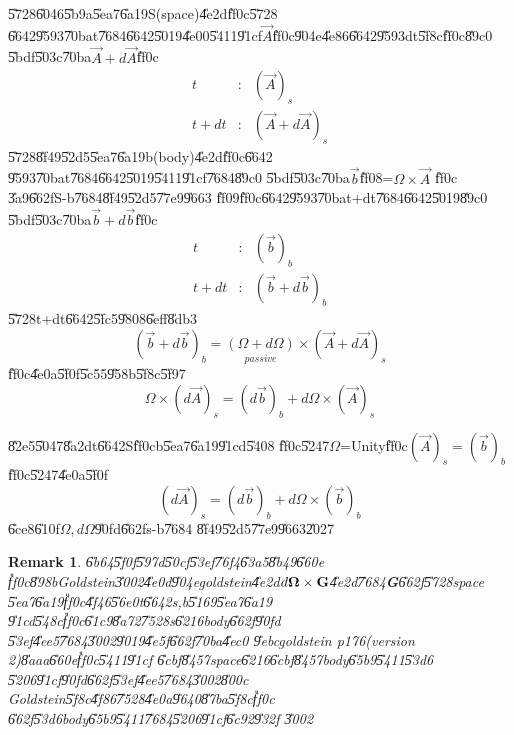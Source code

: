 \documentclass[12pt]{article}
\newtheorem{remark}[theorem]{Remark}
\begin{document}
\U{5728}\U{6046}\U{5b9a}\U{5ea7}\U{6a19}S(space)\U{4e2d}\U{ff0c}\U{5728}%
\U{6642}\U{9593}\U{70ba}t\U{7684}\U{6642}\U{5019}\U{4e00}\U{5411}\U{91cf}$%
\vec{A}$\U{ff0c}\U{904e}\U{4e86}\U{6642}\U{9593}dt\U{5f8c}\U{ff0c}\U{89c0}%
\U{5bdf}\U{503c}\U{70ba}$\vec{A}+d\vec{A}$\U{ff0c}%
\begin{eqnarray}
t &:&(\vec{A})_{s} \\
t+dt &:&\left( \vec{A}+d\vec{A}\right) _{s}
\end{eqnarray}%
\U{5728}\U{8f49}\U{52d5}\U{5ea7}\U{6a19}b(body)\U{4e2d}\U{ff0c}\U{6642}%
\U{9593}\U{70ba}t\U{7684}\U{6642}\U{5019}\U{5411}\U{91cf}\U{7684}\U{89c0}%
\U{5bdf}\U{503c}\U{70ba}$\vec{b}$\U{ff08}=$\Omega \times \vec{A}$ \U{ff0c}%
\U{3a9}\U{662f}S-\TEXTsymbol{>}b\U{7684}\U{8f49}\U{52d5}\U{77e9}\U{9663}%
\U{ff09}\U{ff0c}\U{6642}\U{9593}\U{70ba}t+dt\U{7684}\U{6642}\U{5019}\U{89c0}%
\U{5bdf}\U{503c}\U{70ba}$\vec{b}+d\vec{b}$\U{ff0c}%
\begin{eqnarray}
t &:&\left( \vec{b}\right) _{b} \\
t+dt &:&\left( \vec{b}+d\vec{b}\right) _{b}
\end{eqnarray}%
\U{5728}t+dt\U{6642}\U{5fc5}\U{9808}\U{6eff}\U{8db3}%
\begin{equation}
\left( \vec{b}+d\vec{b}\right) _{b}=\underset{passive}{\left( \Omega
+d\Omega \right) }\times \left( \vec{A}+d\vec{A}\right) _{s}
\end{equation}%
\U{ff0c}\U{4e0a}\U{5f0f}\U{5c55}\U{958b}\U{5f8c}\U{5f97}%
\begin{equation}
\Omega \times \left( d\vec{A}\right) _{s}=\left( d\vec{b}\right)
_{b}+d\Omega \times \left( \vec{A}\right) _{s}
\end{equation}

\U{82e5}\U{5047}\U{8a2d}t\U{6642}S\U{ff0c}b\U{5ea7}\U{6a19}\U{91cd}\U{5408}%
\U{ff0c}\U{5247}$\Omega $=Unity\U{ff0c}$\left( \vec{A}\right) _{s}=\left( 
\vec{b}\right) _{b}$\U{ff0c}\U{5247}\U{4e0a}\U{5f0f}%
\begin{equation}
\left( d\vec{A}\right) _{s}=\left( d\vec{b}\right) _{b}+d\Omega \times
\left( \vec{b}\right) _{b}  \label{vectorrateofchange}
\end{equation}%
\U{6ce8}\U{610f}$\Omega ,d\Omega $\U{90fd}\U{662f}s-\TEXTsymbol{>}b\U{7684}%
\U{8f49}\U{52d5}\U{77e9}\U{9663}\U{2027}

\begin{remark}
\U{6b64}\U{5f0f}\U{597d}\U{50cf}\U{53ef}\U{76f4}\U{63a5}\U{8b49}\U{660e}%
\U{ff0c}\U{898b}Goldstein\U{3002}\U{4e0d}\U{904e}goldstein\U{4e2d}$d\mathbf{%
\Omega }\times \mathbf{G}$\U{4e2d}\U{7684}\textbf{G}\U{662f}\U{5728}space%
\U{5ea7}\U{6a19}\U{ff0c}\U{4f46}\U{56e0}t\U{6642}s,b\U{5169}\U{5ea7}\U{6a19}%
\U{91cd}\U{548c}\U{ff0c}\U{61c9}\U{8a72}\U{7528}s\U{6216}body\U{662f}\U{90fd}%
\U{53ef}\U{4ee5}\U{7684}\U{3002}\U{9019}\U{4e5f}\U{662f}\U{70ba}\U{4ec0}%
\U{9ebc}goldstein p176(version 2)\U{8aaa}\U{660e}\U{ff0c}\U{5411}\U{91cf}%
\U{6cbf}\U{8457}space\U{6216}\U{6cbf}\U{8457}body\U{65b9}\U{5411}\U{53d6}%
\U{5206}\U{91cf}\U{90fd}\U{662f}\U{53ef}\U{4ee5}\U{7684}\U{3002}\U{800c}%
Goldstein\U{5f8c}\U{4f86}\U{7528}\U{4e0a}\U{9640}\U{87ba}\U{5f8c}\U{ff0c}%
\U{662f}\U{53d6}body\U{65b9}\U{5411}\U{7684}\U{5206}\U{91cf}\U{6c92}\U{932f}%
\U{3002}
\end{remark}
\end{document}
